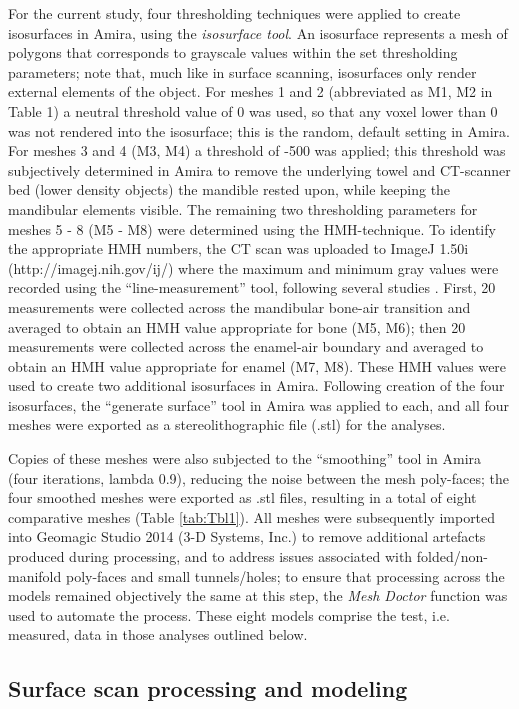 \documentclass[review]{elsarticle}
\begin{document}
For the current study, four thresholding techniques were applied to create isosurfaces in Amira, using the \textit{isosurface tool}. An isosurface represents a mesh of polygons that corresponds to grayscale values within the set thresholding parameters; note that, much like in surface scanning, isosurfaces only render external elements of the object. For meshes 1 and 2 (abbreviated as M1, M2 in Table 1) a neutral threshold value of 0 was used, so that any voxel lower than 0 was not rendered into the isosurface; this is the random, default setting in Amira. For meshes 3 and 4 (M3, M4) a threshold of -500 was applied; this threshold was subjectively determined in Amira to remove the underlying towel and CT-scanner bed (lower density objects) the mandible rested upon, while keeping the mandibular elements visible. The remaining two thresholding parameters for meshes 5 - 8 (M5 - M8) were determined using the HMH-technique. To identify the appropriate HMH numbers, the CT scan was uploaded to ImageJ 1.50i  (http://imagej.nih.gov/ij/) where the maximum and minimum gray values were recorded using the “line-measurement” tool, following several studies \citep{RN5883,RN5882}. First, 20 measurements were collected across the mandibular bone-air transition and averaged to obtain an HMH value appropriate for bone (M5, M6); then 20 measurements were collected across the enamel-air boundary and averaged to obtain an HMH value appropriate for enamel (M7, M8). These HMH values were used to create two additional isosurfaces in Amira. Following creation of the four isosurfaces, the “generate surface” tool in Amira was applied to each, and all four meshes were exported as a stereolithographic file (.stl) for the analyses. 

Copies of these meshes were also subjected to the “smoothing” tool in Amira (four iterations, lambda 0.9), reducing the noise between the mesh poly-faces; the four smoothed meshes were exported as .stl files, resulting in a total of eight comparative meshes (Table \ref{tab:Tbl1}). All meshes were subsequently imported into Geomagic Studio 2014 (3-D Systems, Inc.) to remove additional artefacts produced during processing, and to address issues associated with folded/non-manifold poly-faces and small tunnels/holes; to ensure that processing across the models remained objectively the same at this step, the \textit{Mesh Doctor} function was used to automate the process. These eight models comprise the test, i.e. measured, data in those analyses outlined below. 

\subsection{Surface scan processing and modeling}
\end{document}
